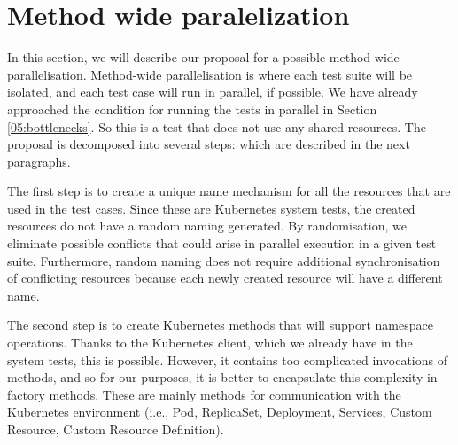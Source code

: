 \section{Method wide paralelization}
\label{04:methodwideparalelisation}

In this section, we will describe our proposal for a possible method-wide parallelisation.
Method-wide parallelisation is where each test suite will be isolated, and each test case will run in parallel, if possible.
We have already approached the condition for running the tests in parallel in Section \ref{05:bottlenecks}.
So this is a test that does not use any shared resources.
The proposal is decomposed into several steps: which are described in the next paragraphs.

The first step is to create a unique name mechanism for all the resources that are used in the test cases.
Since these are Kubernetes system tests, the created resources do not have a random naming generated.
By randomisation, we eliminate possible conflicts that could arise in parallel execution in a given test suite.
Furthermore, random naming does not require additional synchronisation of conflicting resources because each newly created resource will have a different name.

The second step is to create Kubernetes methods that will support namespace operations.
Thanks to the Kubernetes client, which we already have in the system tests, this is possible.
However, it contains too complicated invocations of methods, and so for our purposes, it is better to encapsulate this complexity in factory methods.
These are mainly methods for communication with the Kubernetes environment (i.e., Pod, ReplicaSet, Deployment, Services, Custom Resource, Custom Resource Definition).

